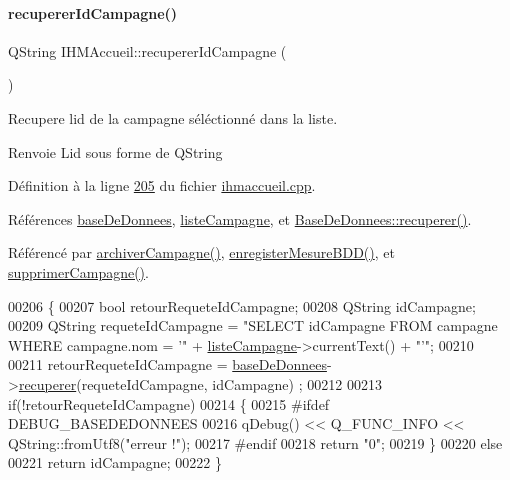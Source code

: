 \paragraph{\texorpdfstring{recuperer\+Id\+Campagne()}{recupererIdCampagne()}}
{\footnotesize\ttfamily Q\+String I\+H\+M\+Accueil\+::recuperer\+Id\+Campagne (\begin{DoxyParamCaption}{ }\end{DoxyParamCaption})\hspace{0.3cm}{\ttfamily [private]}}



Recupere l\textquotesingle{}id de la campagne séléctionné dans la liste. 

\begin{DoxyReturn}{Renvoie}
L\textquotesingle{}id sous forme de Q\+String 
\end{DoxyReturn}


Définition à la ligne \hyperlink{ihmaccueil_8cpp_source_l00205}{205} du fichier \hyperlink{ihmaccueil_8cpp_source}{ihmaccueil.\+cpp}.



Références \hyperlink{ihmaccueil_8h_source_l00040}{base\+De\+Donnees}, \hyperlink{ihmaccueil_8h_source_l00037}{liste\+Campagne}, et \hyperlink{basededonnees_8cpp_source_l00139}{Base\+De\+Donnees\+::recuperer()}.



Référencé par \hyperlink{ihmaccueil_8cpp_source_l00350}{archiver\+Campagne()}, \hyperlink{ihmaccueil_8cpp_source_l00404}{enregister\+Mesure\+B\+D\+D()}, et \hyperlink{ihmaccueil_8cpp_source_l00375}{supprimer\+Campagne()}.


\begin{DoxyCode}
00206 \{
00207     \textcolor{keywordtype}{bool} retourRequeteIdCampagne;
00208     QString idCampagne;
00209     QString requeteIdCampagne = \textcolor{stringliteral}{"SELECT idCampagne FROM campagne WHERE campagne.nom = '"} + 
      \hyperlink{class_i_h_m_accueil_afb828a4e06c25afa40341c310cd85b08}{listeCampagne}->currentText() + \textcolor{stringliteral}{"'"};
00210 
00211     retourRequeteIdCampagne = \hyperlink{class_i_h_m_accueil_ab56d9846c071396a92f88272880e2c1f}{baseDeDonnees}->\hyperlink{class_base_de_donnees_a77539baad389f5acf754cd2cd452403e}{recuperer}(requeteIdCampagne, idCampagne)
      ;
00212 
00213     \textcolor{keywordflow}{if}(!retourRequeteIdCampagne)
00214     \{
00215 \textcolor{preprocessor}{        #ifdef DEBUG\_BASEDEDONNEES}
00216             qDebug() << Q\_FUNC\_INFO << QString::fromUtf8(\textcolor{stringliteral}{"erreur !"});
00217 \textcolor{preprocessor}{        #endif}
00218         \textcolor{keywordflow}{return} \textcolor{stringliteral}{"0"};
00219     \}
00220     \textcolor{keywordflow}{else}
00221         \textcolor{keywordflow}{return} idCampagne;
00222 \}
\end{DoxyCode}
\mbox{\label{class_i_h_m_accueil_aa09878b2e3e3024220291165b5c528a6}} 
